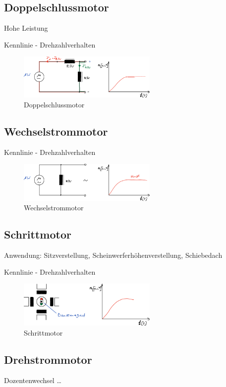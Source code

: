 \subsection{Doppelschlussmotor}\label{doppelschlussmotor}

Hohe Leistung

Kennlinie - Drehzahlverhalten

\begin{figure}[!ht]%
\centering
\includegraphics[width=0.6\textwidth]{images/Skizze/30_FT_Doppelschlussmotor.pdf}
\caption{Doppelschlussmotor}
\end{figure}

\subsection{Wechselstrommotor}\label{wechselstrommotor}

Kennlinie - Drehzahlverhalten

\begin{figure}[!ht]%
\centering
\includegraphics[width=0.6\textwidth]{images/Skizze/30_FT_Wechselstrommotor.pdf}
\caption{Wechselstrommotor}
\end{figure}

\subsection{Schrittmotor}\label{schrittmotor}

Anwendung: Sitzverstellung, Scheinwerferhöhenverstellung, Schiebedach

Kennlinie - Drehzahlverhalten

\begin{figure}[!ht]%
\centering
\includegraphics[width=0.6\textwidth]{images/Skizze/30_FT_Schrittmotor.pdf}
\caption{Schrittmotor}
\end{figure}

\subsection{Drehstrommotor}\label{drehstrommotor}

Dozentenwechsel \ldots{}
